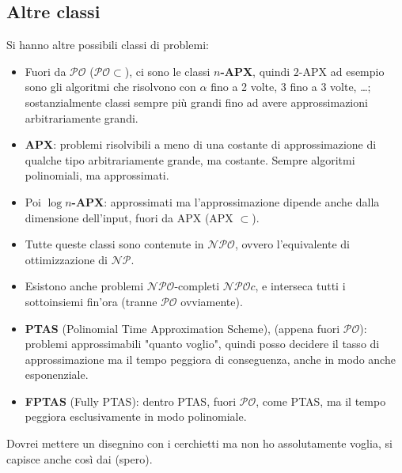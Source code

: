 \newpage

\subsection{Altre classi}
Si hanno altre possibili classi di problemi: 
\begin{itemize}
	\item Fuori da $\mathcal{PO}$ ($\mathcal{PO} \subset$), ci sono le classi \textbf{$n$-APX}, quindi $2$-APX ad esempio sono gli algoritmi che risolvono con $\alpha$ fino a 2 volte, 3 fino a 3 volte, \dots; sostanzialmente classi sempre più grandi fino ad avere approssimazioni arbitrariamente grandi.\\
	
	\item \textbf{APX}: problemi risolvibili a meno di una costante di approssimazione di qualche tipo arbitrariamente grande, ma costante. Sempre algoritmi polinomiali, ma approssimati.\\
	
	\item Poi \textbf{$\log n$-APX}: approssimati ma l'approssimazione dipende anche dalla dimensione dell'input, fuori da APX (APX $\subset$).\\
	
	\item Tutte queste classi sono contenute in $\mathcal{NPO}$, ovvero l'equivalente di ottimizzazione di $\mathcal{NP}$.\\
	
	\item Esistono anche problemi $\mathcal{NPO}$-completi $\mathcal{NPO}c$, e interseca tutti i sottoinsiemi fin'ora (tranne $\mathcal{PO}$ ovviamente).\\
	
	\item \textbf{PTAS} (Polinomial Time Approximation Scheme), (appena fuori $\mathcal{PO}$): problemi approssimabili "quanto voglio", quindi posso decidere il tasso di approssimazione ma il tempo peggiora di conseguenza, anche in modo anche esponenziale.\\
	
	\item \textbf{FPTAS} (Fully PTAS): dentro PTAS, fuori $\mathcal{PO}$, come PTAS, ma il tempo peggiora esclusivamente in modo polinomiale.\\
\end{itemize}

Dovrei mettere un disegnino con i cerchietti ma non ho assolutamente voglia, si capisce anche così dai (spero).\\

